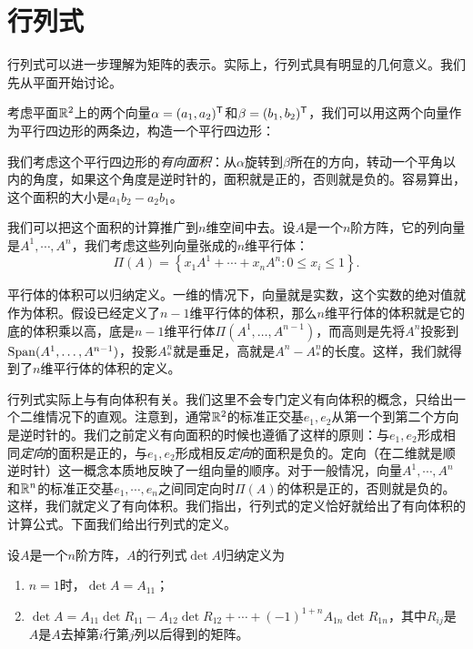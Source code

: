 \section{行列式}
行列式可以进一步理解为矩阵的表示。实际上，行列式具有明显的几何意义。我们先从平面开始讨论。

考虑平面$\mathbb{R}^2$上的两个向量$\alpha=(a_1,a_2)^{\mathsf{T}}$和$\beta=(b_1,b_2)^{\mathsf{T}}$，我们可以用这两个向量作为平行四边形的两条边，构造一个平行四边形：
\begin{center}
\end{center}
我们考虑这个平行四边形的\emph{有向面积}：从$\alpha$旋转到$\beta$所在的方向，转动一个平角以内的角度，如果这个角度是逆时针的，面积就是正的，否则就是负的。容易算出，这个面积的大小是$a_1b_2-a_2b_1$。

我们可以把这个面积的计算推广到$n$维空间中去。设$A$是一个$n$阶方阵，它的列向量是$A^1,\cdots,A^n$，我们考虑这些列向量张成的$n$维平行体：
\[\Pi(A)=\left\{x_1A^1+\cdots+x_nA^n:0\leq x_i\leq 1\right\}.\]

平行体的体积可以归纳定义。一维的情况下，向量就是实数，这个实数的绝对值就作为体积。假设已经定义了$n-1$维平行体的体积，那么$n$维平行体的体积就是它的底的体积乘以高，底是$n-1$维平行体$\Pi(A^1,\dots,A^{n-1})$，而高则是先将$A^n$投影到$\operatorname*{Span}(A^1,\dots,A^{n-1})$，投影$A^n_*$就是垂足，高就是$A^n-A^n_*$的长度。这样，我们就得到了$n$维平行体的体积的定义。

行列式实际上与有向体积有关。我们这里不会专门定义有向体积的概念，只给出一个二维情况下的直观。注意到，通常$\mathbb{R}^2$的标准正交基$e_1,e_2$从第一个到第二个方向是逆时针的。我们之前定义有向面积的时候也遵循了这样的原则：与$e_1,e_2$形成相同\emph{定向}的面积是正的，与$e_1,e_2$形成相反\emph{定向}的面积是负的。定向（在二维就是顺逆时针）这一概念本质地反映了一组向量的顺序。对于一般情况，向量$A^1,\cdots,A^n$和$\mathbb{R}^n$的标准正交基$e_1,\cdots,e_n$之间同定向时$\Pi(A)$的体积是正的，否则就是负的。这样，我们就定义了有向体积。我们指出，行列式的定义恰好就给出了有向体积的计算公式。下面我们给出行列式的定义。

\begin{definition}[行列式]
    设$A$是一个$n$阶方阵，$A$的行列式$\det A$归纳定义为
\begin{enumerate}
    \item $n=1$时，$\det A=A_{11}$；
    \item $\det A=A_{11}\det R_{11}-A_{12}\det R_{12}+\cdots+(-1)^{1+n}A_{1n}\det R_{1n}$，其中$R_{ij}$是$A$是$A$去掉第$i$行第$j$列以后得到的矩阵。
\end{enumerate}
\end{definition}

